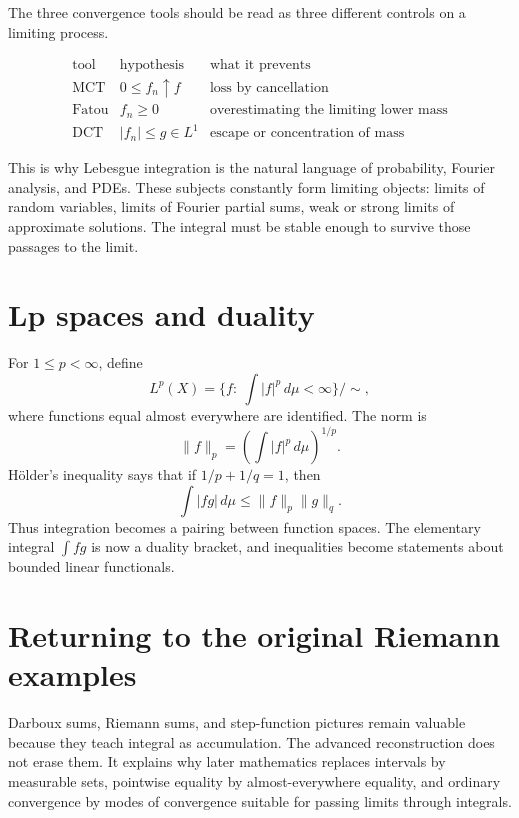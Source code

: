 The three convergence tools should be read as three different controls on a limiting process.

\[
\begin{array}{c|c|c}
\text{tool} & \text{hypothesis} & \text{what it prevents}\\
\hline
\text{MCT} & 0\le f_n\uparrow f & \text{loss by cancellation}\\
\text{Fatou} & f_n\ge0 & \text{overestimating the limiting lower mass}\\
\text{DCT} & |f_n|\le g\in L^1 & \text{escape or concentration of mass}
\end{array}
\]

This is why Lebesgue integration is the natural language of probability, Fourier analysis, and PDEs.  These subjects constantly form limiting objects: limits of random variables, limits of Fourier partial sums, weak or strong limits of approximate solutions.  The integral must be stable enough to survive those passages to the limit.

\section{Lp spaces and duality}

For $1\le p<\infty$, define
\[
  L^p(X)=\{f:\ \int |f|^p\,d\mu<\infty\}/\sim,
\]
where functions equal almost everywhere are identified.  The norm is
\[
  \|f\|_p=\left(\int |f|^p\,d\mu\right)^{1/p}.
\]
Hölder's inequality says that if $1/p+1/q=1$, then
\[
  \int |fg|\,d\mu\le \|f\|_p\|g\|_q.
\]
Thus integration becomes a pairing between function spaces.  The elementary integral $\int fg$ is now a duality bracket, and inequalities become statements about bounded linear functionals.

\section{Returning to the original Riemann examples}

Darboux sums, Riemann sums, and step-function pictures remain valuable because they teach integral as accumulation.  The advanced reconstruction does not erase them.  It explains why later mathematics replaces intervals by measurable sets, pointwise equality by almost-everywhere equality, and ordinary convergence by modes of convergence suitable for passing limits through integrals.
